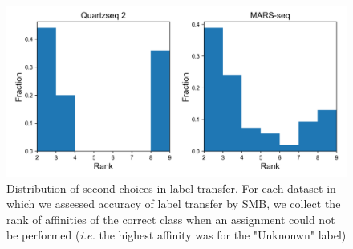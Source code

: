 \documentclass[11pt, titlepage, twoside]{article}
\begin{document}
\begin{figure}[htbp]
\centering
\includegraphics[keepaspectratio,width=\textwidth,height=0.75\textheight]{hist_label_second.png}
\caption[]{Distribution of second choices in label transfer. For each dataset in which we assessed accuracy of label transfer by SMB, we collect the rank of affinities of the correct class when an assignment could not be performed (\emph{i.e.} the highest affinity was for the "Unknonwn" label)  }\label{hist_label_second}
\end{figure}
\clearpage

\end{document}
